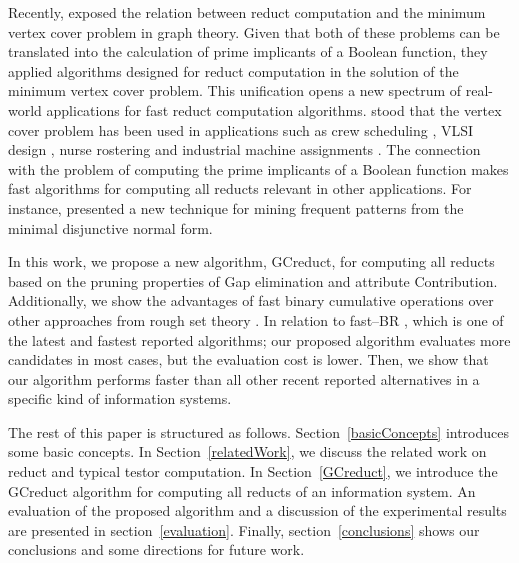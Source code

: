 \documentclass[authoryear,preprint,review,12pt]{elsarticle}
\begin{document}
  Recently, \cite{chen2015} exposed the relation between reduct computation and the minimum vertex cover
  problem in graph theory. Given that both of these problems can be translated into the calculation of
  prime implicants of a Boolean function, they applied algorithms designed for reduct computation in the
  solution of the minimum vertex cover problem. This unification opens a new spectrum of real-world applications
  for fast reduct computation algorithms. \cite{chen2015} stood that the vertex cover problem has been used in applications such as crew scheduling \citep{Sherali1984}, VLSI design \citep{Bhattacharyya2000}, nurse rostering \citep{Caprara1998} and industrial machine assignments \citep{Woodyatt1993}. The connection with the problem of computing the prime implicants of a Boolean function makes fast algorithms for computing all reducts relevant in other applications. For instance, \cite{Li2015} presented a new technique for mining frequent patterns from the minimal disjunctive normal form.



  In this work, we propose a new algorithm, GCreduct, for computing all reducts based on the pruning properties of Gap elimination and attribute Contribution. Additionally, we show the advantages of fast binary cumulative operations \citep{Sanchez10,Lias13} over other approaches from rough set theory \citep{WangP07,Jensen14}. In relation to fast--BR \citep{Lias13}, which is one of the latest and fastest reported algorithms; our proposed algorithm evaluates more candidates in most cases, but the evaluation cost is lower. Then, we show that our algorithm performs faster than all other recent reported alternatives in a specific kind of information systems. 
  
  
  The rest of this paper is structured as follows. Section~\ref{basicConcepts}  introduces some basic concepts. In Section~\ref{relatedWork}, we discuss the related work on reduct and typical testor computation.  In Section~\ref{GCreduct}, we introduce the GCreduct algorithm for computing all reducts of an information system. An evaluation of the proposed algorithm and a discussion of the experimental results are presented in section~\ref{evaluation}. Finally, section~\ref{conclusions} shows our conclusions and some directions for future work.
   
\end{document}
